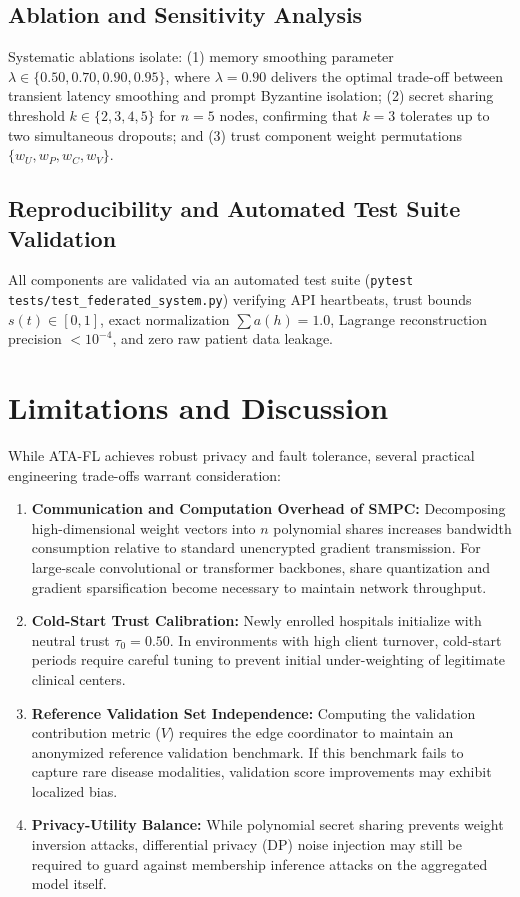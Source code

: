 \documentclass[conference]{IEEEtran}
\begin{document}
\subsection{Ablation and Sensitivity Analysis}
Systematic ablations isolate: (1) memory smoothing parameter $\lambda \in \{0.50, 0.70, 0.90, 0.95\}$, where $\lambda = 0.90$ delivers the optimal trade-off between transient latency smoothing and prompt Byzantine isolation; (2) secret sharing threshold $k \in \{2, 3, 4, 5\}$ for $n = 5$ nodes, confirming that $k=3$ tolerates up to two simultaneous dropouts; and (3) trust component weight permutations $\{w_U, w_P, w_C, w_V\}$.

\subsection{Reproducibility and Automated Test Suite Validation}
All components are validated via an automated test suite (\texttt{pytest tests/test\_federated\_system.py}) verifying API heartbeats, trust bounds $s(t) \in [0, 1]$, exact normalization $\sum a(h) = 1.0$, Lagrange reconstruction precision $< 10^{-4}$, and zero raw patient data leakage.

\section{Limitations and Discussion}
While ATA-FL achieves robust privacy and fault tolerance, several practical engineering trade-offs warrant consideration:
\begin{enumerate}
    \item \textbf{Communication and Computation Overhead of SMPC:} Decomposing high-dimensional weight vectors into $n$ polynomial shares increases bandwidth consumption relative to standard unencrypted gradient transmission. For large-scale convolutional or transformer backbones, share quantization and gradient sparsification become necessary to maintain network throughput.
    \item \textbf{Cold-Start Trust Calibration:} Newly enrolled hospitals initialize with neutral trust $\tau_0 = 0.50$. In environments with high client turnover, cold-start periods require careful tuning to prevent initial under-weighting of legitimate clinical centers.
    \item \textbf{Reference Validation Set Independence:} Computing the validation contribution metric ($V$) requires the edge coordinator to maintain an anonymized reference validation benchmark. If this benchmark fails to capture rare disease modalities, validation score improvements may exhibit localized bias.
    \item \textbf{Privacy-Utility Balance:} While polynomial secret sharing prevents weight inversion attacks, differential privacy (DP) noise injection may still be required to guard against membership inference attacks on the aggregated model itself.
\end{enumerate}
\end{document}
